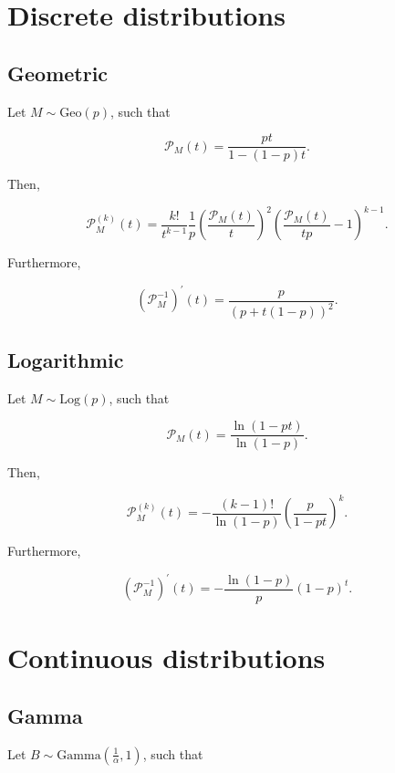 \documentclass[11pt, english]{article}\usepackage[]{graphicx}\usepackage[]{color}
\begin{document}
\newpage

\appendix

\section{Discrete distributions}

\subsection{Geometric}

Let $M \sim \mathrm{Geo}(p)$, such that

\begin{equation*}
  \mathcal{P}_M(t) = \frac{p t}{1 - (1 - p) t}.
\end{equation*}

Then,

$$ \mathcal{P}_M^{(k)}(t) = \frac{k!}{t^{k-1}} \frac{1}{p} \left(\frac{\mathcal{P}_M(t)}{t}\right)^2 \left(\frac{\mathcal{P}_M(t)}{t p} - 1\right)^{k - 1}. $$


Furthermore,

$$ \left(\mathcal{P}_M^{-1}\right)^\prime(t) = \frac{p}{(p + t (1 - p))^2}. $$

\subsection{Logarithmic}

Let $M \sim \mathrm{Log}(p)$, such that

$$ \mathcal{P}_M(t) = \frac{\ln(1 - pt)}{\ln(1 - p)}. $$

Then,

$$ \mathcal{P}_M^{(k)}(t) = -\frac{(k - 1)!}{\ln(1 - p)} \left(\frac{p}{1 - pt}\right)^k. $$

Furthermore,

$$ \left( \mathcal{P}_M^{-1} \right)^\prime (t) = -\frac{\ln(1 - p)}{p} (1 - p)^t. $$

\section{Continuous distributions}

\subsection{Gamma}

Let $B \sim \mathrm{Gamma}\left(\frac{1}{\alpha}, 1\right)$, such that
\end{document}
